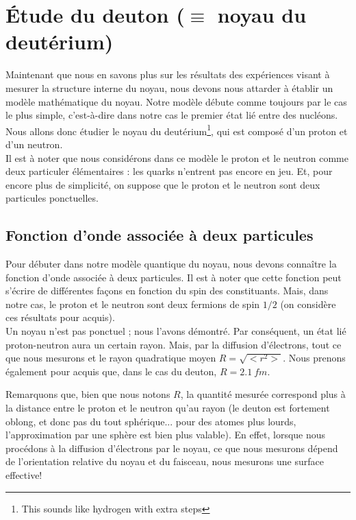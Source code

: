 \section{Étude du deuton ($\equiv$ noyau du deutérium)}

Maintenant que nous en savons plus sur les résultats des expériences visant à mesurer la structure interne du noyau, nous devons nous attarder à établir un modèle mathématique du noyau. Notre modèle débute comme toujours par le cas le plus simple, c'est-à-dire dans notre cas le premier état lié entre des nucléons. Nous allons donc étudier le noyau du deutérium\footnote{This sounds like hydrogen with extra steps}, qui est composé d'un proton et d'un neutron.\\
Il est à noter que nous considérons dans ce modèle le proton et le neutron comme deux particuler élémentaires : les quarks n'entrent pas encore en jeu. Et, pour encore plus de simplicité, on suppose que le proton et le neutron sont deux particules ponctuelles.\\


\subsection{Fonction d'onde associée à deux particules}


Pour débuter dans notre modèle quantique du noyau, nous devons connaître la fonction d'onde associée à deux particules. Il est à noter que cette fonction peut s'écrire de différentes façons en fonction du spin des constituants. Mais, dans notre cas, le proton et le neutron sont deux fermions de spin $1/2$ (on considère ces résultats pour acquis).\\

Un noyau n'est pas ponctuel ; nous l'avons démontré. Par conséquent, un état lié proton-neutron aura un certain rayon. Mais, par la diffusion d'électrons, tout ce que nous mesurons et le rayon quadratique moyen $R = \sqrt{<r^2>}$. Nous prenons également pour acquis que, dans le cas du deuton, $R= \SI{2.1}{fm}$.

Remarquons que, bien que nous notons $R$, la quantité mesurée correspond plus à la distance entre le proton et le neutron qu'au rayon (le deuton est fortement oblong, et donc pas du tout sphérique... pour des atomes plus lourds, l'approximation par une sphère est bien plus valable). En effet, lorsque nous procédons à la diffusion d'électrons par le noyau, ce que nous mesurons dépend de l'orientation relative du noyau et du faisceau, nous mesurons une surface effective!

